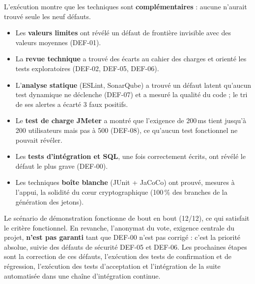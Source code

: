 \documentclass[12pt,a4paper]{report}
\begin{document}
L'exécution montre que les techniques sont \textbf{complémentaires} : aucune n'aurait trouvé seule les neuf défauts.
\begin{itemize}
  \item Les \textbf{valeurs limites} ont révélé un défaut de frontière invisible avec des valeurs moyennes (DEF-01).
  \item La \textbf{revue technique} a trouvé des écarts au cahier des charges et orienté les tests exploratoires (DEF-02, DEF-05, DEF-06).
  \item L'\textbf{analyse statique} (ESLint, SonarQube) a trouvé un défaut latent qu'aucun test dynamique ne déclenche (DEF-07) et a mesuré la qualité du code ; le tri de ses alertes a écarté 3 faux positifs.
  \item Le \textbf{test de charge JMeter} a montré que l'exigence de 200\,ms tient jusqu'à 200 utilisateurs mais pas à 500 (DEF-08), ce qu'aucun test fonctionnel ne pouvait révéler.
  \item Les \textbf{tests d'intégration et SQL}, une fois correctement écrits, ont révélé le défaut le plus grave (DEF-00).
  \item Les techniques \textbf{boîte blanche} (JUnit + JaCoCo) ont prouvé, mesures à l'appui, la solidité du cœur cryptographique (100\,\% des branches de la génération des jetons).
\end{itemize}

Le scénario de démonstration fonctionne de bout en bout (12/12), ce qui satisfait le critère fonctionnel. En revanche, l'anonymat du vote, exigence centrale du projet, \textbf{n'est pas garanti} tant que DEF-00 n'est pas corrigé : c'est la priorité absolue, suivie des défauts de sécurité DEF-05 et DEF-06. Les prochaines étapes sont la correction de ces défauts, l'exécution des tests de confirmation et de régression, l'exécution des tests d'acceptation et l'intégration de la suite automatisée dans une chaîne d'intégration continue.
\end{document}
